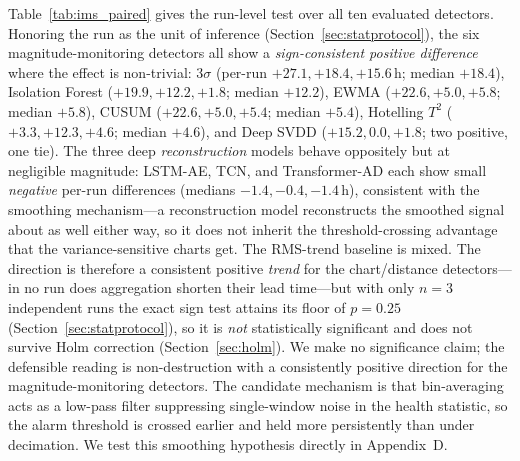 \documentclass[journal]{IEEEtran}
\begin{document}
Table~\ref{tab:ims_paired} gives the run-level test over all ten evaluated detectors.
Honoring the run as the unit of inference (Section~\ref{sec:statprotocol}), the
six magnitude-monitoring detectors all show a \emph{sign-consistent positive
difference} where the effect is non-trivial: 3$\sigma$ (per-run
$+27.1, +18.4, +15.6$\,h; median $+18.4$), Isolation Forest
($+19.9, +12.2, +1.8$; median $+12.2$), EWMA ($+22.6, +5.0, +5.8$; median
$+5.8$), CUSUM ($+22.6, +5.0, +5.4$; median $+5.4$), Hotelling $T^2$
($+3.3, +12.3, +4.6$; median $+4.6$), and Deep SVDD ($+15.2, 0.0, +1.8$; two
positive, one tie). The three deep \emph{reconstruction} models behave
oppositely but at negligible magnitude: LSTM-AE, TCN, and Transformer-AD each
show small \emph{negative} per-run differences (medians $-1.4, -0.4, -1.4$\,h),
consistent with the smoothing mechanism---a reconstruction model reconstructs
the smoothed signal about as well either way, so it does not inherit the
threshold-crossing advantage that the variance-sensitive charts get. The
RMS-trend baseline is mixed. The direction is therefore a consistent positive
\emph{trend} for the chart/distance detectors---in no run does aggregation
shorten their lead time---but with only $n{=}3$ independent runs the exact sign
test attains its floor of $p{=}0.25$ (Section~\ref{sec:statprotocol}), so it is
\emph{not} statistically significant and does not survive Holm correction
(Section~\ref{sec:holm}). We make no significance claim; the defensible reading
is non-destruction with a consistently positive direction for the
magnitude-monitoring detectors. The candidate mechanism is that bin-averaging
acts as a low-pass filter suppressing single-window noise in the health
statistic, so the alarm threshold is crossed earlier and held more persistently
than under decimation. We test this smoothing hypothesis directly in
Appendix~D.
\end{document}

